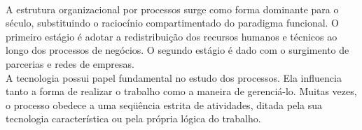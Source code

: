 \documentclass[a4paper,12pt]{article}
\begin{document}
\\     \indent A estrutura organizacional por processos surge como forma dominante para o século, substituindo o raciocínio compartimentado do paradigma funcional. O primeiro estágio é adotar a redistribuição dos recursos humanos e técnicos ao longo dos processos de negócios. O segundo estágio é dado com o surgimento de parcerias e redes de empresas.
\\     \indent 
A tecnologia possui papel fundamental no estudo dos processos. Ela influencia tanto a forma de realizar o trabalho como a maneira de gerenciá-lo. Muitas vezes, o processo obedece a uma seqüência estrita de atividades, ditada pela sua tecnologia característica ou pela própria lógica do trabalho.
\end{document}
